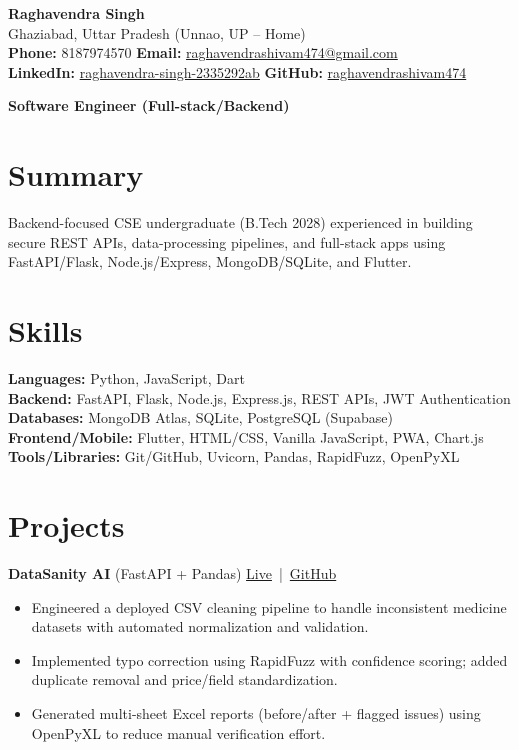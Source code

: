 \documentclass[11pt,a4paper]{article}
\newcommand{\resitem}[1]{\item \small #1}
\newcommand{\projspace}{\vspace{1pt}} %
\begin{document}
{\LARGE \textbf{Raghavendra Singh}} \\
Ghaziabad, Uttar Pradesh (Unnao, UP -- Home) \\
\textbf{Phone:} 8187974570 \quad
\textbf{Email:} \href{mailto:raghavendrashivam474@gmail.com}{raghavendrashivam474@gmail.com} \\
\textbf{LinkedIn:} \href{https://www.linkedin.com/in/raghavendra-singh-2335292ab/}{raghavendra-singh-2335292ab} \quad
\textbf{GitHub:} \href{https://github.com/raghavendrashivam474}{raghavendrashivam474}

\vspace{3pt}
\textbf{Software Engineer (Full-stack/Backend)}

\section*{Summary}
\small
Backend-focused CSE undergraduate (B.Tech 2028) experienced in building secure REST APIs, data-processing pipelines, and full-stack apps using FastAPI/Flask, Node.js/Express, MongoDB/SQLite, and Flutter.

\section*{Skills}
\small
\textbf{Languages:} Python, JavaScript, Dart \\
\textbf{Backend:} FastAPI, Flask, Node.js, Express.js, REST APIs, JWT Authentication \\
\textbf{Databases:} MongoDB Atlas, SQLite, PostgreSQL (Supabase) \\
\textbf{Frontend/Mobile:} Flutter, HTML/CSS, Vanilla JavaScript, PWA, Chart.js \\
\textbf{Tools/Libraries:} Git/GitHub, Uvicorn, Pandas, RapidFuzz, OpenPyXL

\section*{Projects}

\textbf{DataSanity AI} (FastAPI + Pandas) \hfill
\href{https://datasanity-ai.onrender.com}{Live} \,|\, \href{https://github.com/raghavendrashivam474/datasanity-ai}{GitHub}
\begin{itemize}
  \resitem{Engineered a deployed CSV cleaning pipeline to handle inconsistent medicine datasets with automated normalization and validation.}
  \resitem{Implemented typo correction using RapidFuzz with confidence scoring; added duplicate removal and price/field standardization.}
  \resitem{Generated multi-sheet Excel reports (before/after + flagged issues) using OpenPyXL to reduce manual verification effort.}
\end{itemize}
\projspace
\end{document}
